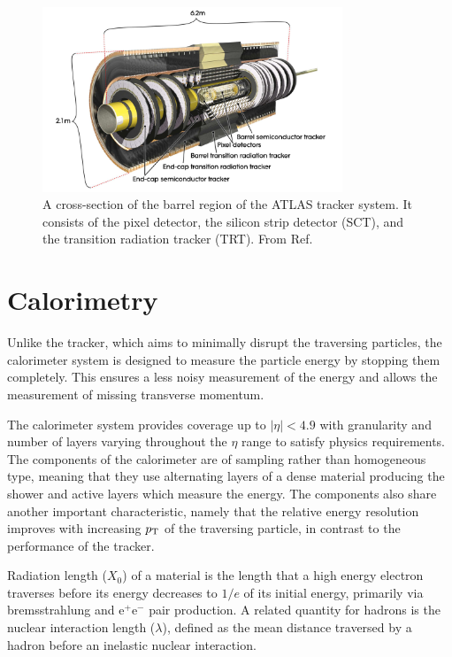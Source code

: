 \begin{figure}[h]
  \centering
  \includegraphics[width=0.8\textwidth]{figures/experiment/tracker}
  \caption[The ATLAS tracker.]{A cross-section of the barrel region
  of the ATLAS tracker system. It consists of the pixel detector,
  the silicon strip detector (SCT), and the transition radiation
  tracker (TRT).
  From Ref. \cite{Potamianos:2016ptf}}
   \label{fig:exp:tracker}
\end{figure}

\section{Calorimetry}

Unlike the tracker, which aims to minimally disrupt the traversing
particles, the calorimeter system is designed to measure the
particle energy by stopping them completely. This ensures a less
noisy measurement of the energy and allows the measurement of
missing transverse momentum.

The calorimeter system provides coverage
up to $|\eta| < 4.9$ with granularity and number of layers varying
throughout the $\eta$ range to satisfy physics requirements. The
components of the calorimeter are of sampling rather than homogeneous
type, meaning that they use alternating layers of a dense material
producing the shower and active layers which measure the energy. The
components also share another important characteristic, namely that
the relative energy resolution improves with increasing $p_{\text{T}}$ of
the traversing particle, in contrast to the performance of the
tracker.

Radiation length ($X_0$) of a material is the length that a high
energy electron traverses before its energy decreases to $1/e$ of
its initial energy, primarily via bremsstrahlung and e$^+$e$^-$
pair production. A related quantity for hadrons is the nuclear
interaction length ($\lambda$), defined as the mean distance traversed by a
hadron before an inelastic nuclear interaction. 

